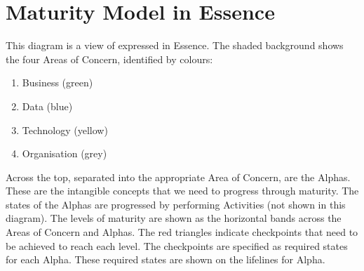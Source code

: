 \pagebreak
\section{Maturity Model in Essence}


This diagram is a view of  expressed in Essence.
The shaded background shows the four Areas of Concern, identified by colours:

\begin{enumerate}
    \item Business (green)
    \item Data (blue)
    \item Technology (yellow)
    \item Organisation (grey)
\end{enumerate}

Across the top, separated into the appropriate Area of Concern, are the Alphas.
These are the intangible concepts that we need to progress through maturity.
The states of the Alphas are progressed by performing Activities (not shown in this diagram).
The levels of maturity are shown as the horizontal bands across the Areas of Concern and Alphas.
The red triangles indicate checkpoints that need to be achieved to reach each level.
The checkpoints are specified as required states for each Alpha.
These required states are shown on the lifelines for Alpha.


